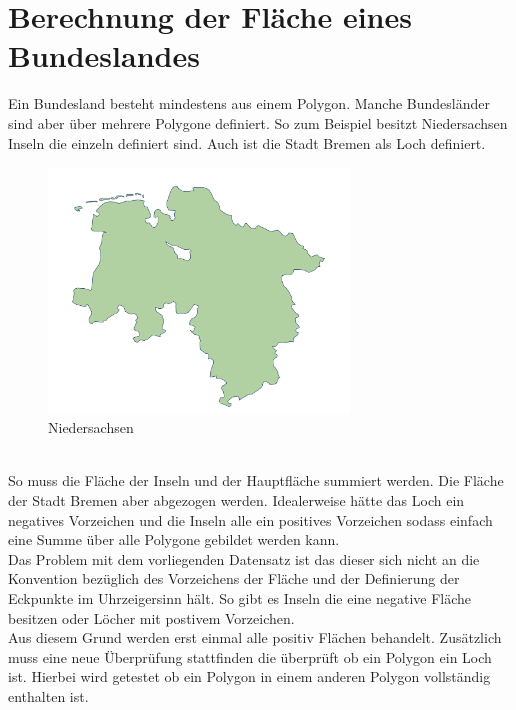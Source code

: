\documentclass[conference]{IEEEtran}
\begin{document}
	
	\section{Berechnung der Fläche eines Bundeslandes}
	Ein Bundesland besteht mindestens aus einem Polygon. Manche Bundesländer sind aber über mehrere Polygone definiert. So zum Beispiel besitzt Niedersachsen Inseln die einzeln definiert sind. Auch ist die Stadt Bremen als Loch definiert. 
	\begin{figure}[h]
		\begin{center}
			\includegraphics[width=8cm]{Niedersachsen.png}
			\caption{Niedersachsen}
			\label{Niedersachsen}
		\end{center}
	\end{figure}\\
	So muss die Fläche der Inseln und der Hauptfläche summiert werden. Die Fläche der Stadt Bremen aber abgezogen werden. Idealerweise hätte das Loch ein negatives Vorzeichen und die Inseln alle ein positives Vorzeichen sodass einfach eine Summe über alle Polygone gebildet werden kann.\\
	Das Problem mit dem vorliegenden Datensatz ist das dieser sich nicht an die Konvention bezüglich des Vorzeichens der Fläche und der Definierung der Eckpunkte im Uhrzeigersinn hält. So gibt es Inseln die eine negative Fläche besitzen oder Löcher mit postivem Vorzeichen.\\
	Aus diesem Grund werden erst einmal alle positiv Flächen behandelt. Zusätzlich muss eine neue Überprüfung stattfinden die überprüft ob ein Polygon ein Loch ist. Hierbei wird getestet ob ein Polygon in einem anderen Polygon vollständig enthalten ist.
\end{document}
